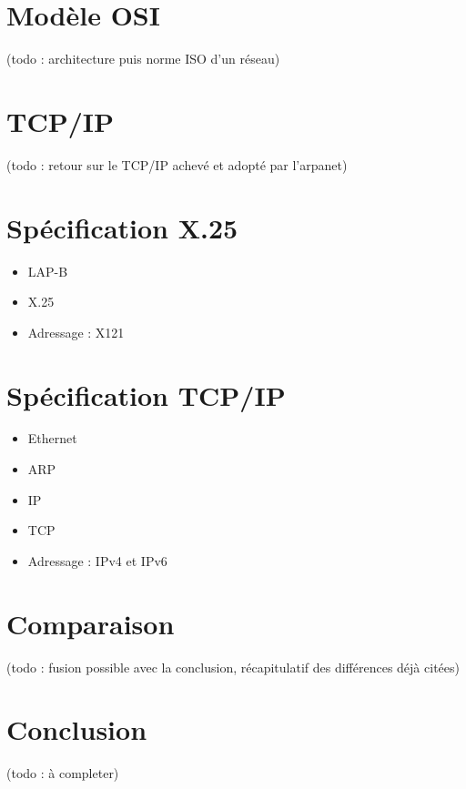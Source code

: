 \documentclass[12pt]{report}
\begin{document}
\section{Modèle OSI}
(todo : architecture puis norme ISO d'un réseau)

\section{TCP/IP}
(todo : retour sur le TCP/IP achevé et adopté par l'arpanet)

\section{Spécification X.25}
\begin{itemize}
\item LAP-B
\item X.25
\item Adressage : X121
\end{itemize}
\section{Spécification TCP/IP}
\begin{itemize}
\item Ethernet
\item ARP
\item IP
\item TCP
\item Adressage : IPv4 et IPv6
\end{itemize}


\section{Comparaison}
(todo : fusion possible avec la conclusion, récapitulatif des différences déjà citées)
\section{Conclusion}
(todo : à completer)
\end{document}
